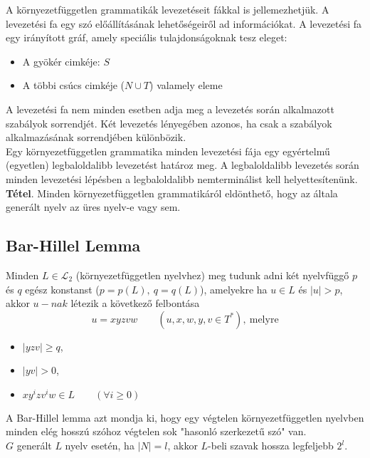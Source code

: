 \documentclass[12pt,margin=0px]{article}
\begin{document}
    \noindent A környezetfüggetlen grammatikák levezetéseit fákkal is jellemezhetjük. A levezetési fa egy szó előállításának lehetőségeiről ad információkat. A levezetési fa egy irányított gráf, amely speciális tulajdonságoknak tesz eleget:
	\begin{itemize}
		\item A gyökér cimkéje: $S$
		\item A többi csúcs cimkéje ($N\cup T$) valamely eleme
	\end{itemize}

    \noindent A levezetési fa nem minden esetben adja meg a levezetés során alkalmazott szabályok sorrendjét. Két levezetés lényegében azonos, ha csak a szabályok alkalmazásának sorrendjében különbözik.\\
					
    \noindent Egy környezetfüggetlen grammatika minden levezetési fája egy egyértelmű (egyetlen) legbaloldalibb levezetést határoz meg. A legbaloldalibb levezetés során minden levezetési lépésben a legbaloldalibb nemterminálist kell helyettesítenünk.\\

	\noindent \textbf{Tétel}. Minden környezetfüggetlen grammatikáról eldönthető, hogy az általa generált nyelv az üres nyelv-e vagy sem.

	\subsection*{Bar-Hillel Lemma}

    \noindent Minden $L \in \mathcal{L}_2$ (környezetfüggetlen nyelvhez) meg tudunk adni két nyelvfüggő $p$ és $q$ egész konstanst ($p=p(L),\ q = q(L)$), amelyekre ha $u \in L$ és $|u| > p$, akkor $u-nak$ létezik a következő felbontása
    \[
        u = xyzvw \qquad (u,x,w,y,v \in T^*),\ \text{melyre}
    \]
	\begin{itemize}
        \item $|yzv| \geq q$,
        \item $|yv| > 0$,
        \item $xy^{i}zv^{i}w \in L \qquad (\forall i \geq 0)$
    \end{itemize}

    \noindent A Bar-Hillel lemma azt mondja ki, hogy egy végtelen környezetfüggetlen nyelvben minden elég hosszú szóhoz végtelen sok "hasonló szerkezetű szó" van.\\

    \noindent $G$ generált $L$ nyelv esetén, ha $|N| = l$, akkor $L$-beli szavak hossza legfeljebb $2^l$.\\
	
\end{document}
